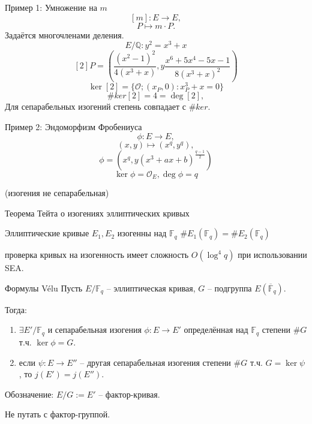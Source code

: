 \documentclass{beamer}
\begin{document}
\begin{frame}{Пример 1: Умножение на $m$}
    \[[m]: E \rightarrow E,\]
    \[P \mapsto m \cdot P.\]
Задаётся многочленами деления.
\[E/\mathbb{Q}: y^2 = x^3 + x\]
\[
[2]P = \left( \frac{(x^2-1)^2}{4 (x^3 + x)}, y \frac{x^6 + 5 x^4 - 5 x - 1}{8 (x^3 + x)^2} \right)
\]
\[
\ker[2] = \{ \mathcal{O}; (x_P,0): x_P^3 + x = 0\}
\]
\[\#ker[2] = 4 = \deg[2],\]
Для сепарабельных изогений степень совпадает с $\#ker$.
\end{frame}

\begin{frame}{Пример 2: Эндоморфизм Фробениуса}
\[\phi: E \rightarrow E,\]
\[(x,y) \mapsto (x^q, y^q),\]
\[
\phi = (x^q, y (x^3 + a x + b)^{\frac{q-1}{2}})
\]
\[
\ker{\phi} = \mathcal{O}_E, \deg{\phi} = q
\]
\begin{center}
(изогения не сепарабельная)
\end{center}
\end{frame}

\begin{frame}{Теорема Тейта о изогениях эллиптических кривых}
	\begin{center}
		Эллиптические кривые $E_1, E_2$ изогенны над $\mathbb{F}_q$ \structure{$\iff$} $\#E_1(\mathbb{F}_q) = \#E_2(\mathbb{F}_q)$
	\end{center}
		 проверка кривых на изогенность имеет сложность $O(\log^4{q})$ при использовании SEA.
\end{frame}

\begin{frame}{Формулы V\'{e}lu}
Пусть $E/\mathbb{F}_q$ -- эллиптическая кривая, $G$ -- подгруппа $E(\overline{\mathbb{F}}_q)$.
\vspace{0.3em}

Тогда:
\vspace{0.5em}
\begin{enumerate}
    \item $\exists E'/\mathbb{F}_q$ и сепарабельная изогения $\phi: E \rightarrow E'$ определённая над $\mathbb{F}_q$ степени $\#G$ т.ч. $\ker\phi = G$.
    \vspace{0.2em}
    \item если $\psi: E \rightarrow E''$ -- другая сепарабельная изогения степени $\#G$ т.ч. $G = \ker\psi$, то $j(E') = j(E'')$.
\end{enumerate}
\vspace{0.5em}
Обозначение: $E/G := E'$ -- фактор-кривая.

\vspace{0.5em}
 Не путать с фактор-группой.
\end{frame}
\end{document}
